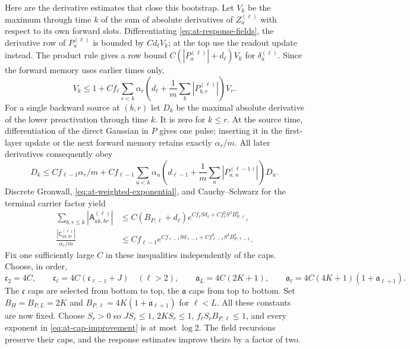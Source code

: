 Here are the derivative estimates that close this bootstrap.  Let $V_k$
be the maximum through time $k$ of the sum of absolute derivatives of
$Z_a^{(\ell)}$ with respect to its own forward slots.  Differentiating
\eqref{eq:at-response-fields}, the derivative row of $P_a^{(\ell)}$
is bounded by $C d_\ell V_k$; at the top use the readout update instead.
The product rule gives a row bound
$C(|P_a^{(\ell)}|+d_\ell)V_k$ for $\delta_a^{(\ell)}$.  Since the
forward memory uses earlier times only,
\[
 V_k\le1+Cf_\ell\sum_{r<k}\alpha_r
       \left(d_\ell+\frac1m\sum_b|P_{b,r}^{(\ell)}|\right)V_r.
\]
For a single backward source at $(b,r)$ let $D_k$ be the maximal
absolute derivative of the lower preactivation through time $k$.
It is zero for $k\le r$.  At the source time, differentiation of the
direct Gaussian in $P$ gives one pulse; inserting it in the first-layer
update or the next forward memory retains exactly $\alpha_r/m$.
All later derivatives consequently obey
\[
 D_k\le Cf_{\ell-1}\alpha_r/m+
 Cf_{\ell-1}\sum_{u<k}\alpha_u
       \left(d_{\ell-1}+\frac1m\sum_a|P_{a,u}^{(\ell-1)}|\right)D_u.
\]
Discrete Gronwall, \eqref{eq:at-weighted-exponential}, and
Cauchy--Schwarz for the terminal carrier factor yield
\begin{align}
 \sum_{b,r\le k}|\mathsf A_{ak,br}^{(\ell)}|
 &\le C(B_{P,\ell}+d_\ell)
       e^{Cf_\ell Sd_\ell+Cf_\ell^2S^2B_{P,\ell}^2},\nonumber\\
 \frac{|\mathsf C_{ak,br}^{(\ell)}|}{\alpha_r/m}
 &\le Cf_{\ell-1}
       e^{Cf_{\ell-1}Sd_{\ell-1}
                          +Cf_{\ell-1}^2S^2B_{P,\ell-1}^2}.
 \label{eq:at-cap-improvement}
\end{align}
Fix one sufficiently large $C$ in these inequalities independently of
the caps.  Choose, in order,
\[
 \mathfrak c_2=4C,\qquad
 \mathfrak c_\ell=4C(\mathfrak c_{\ell-1}+J)\quad(\ell>2),
 \qquad
 \mathfrak a_L=4C(2K+1),\qquad
 \mathfrak a_\ell=4C(4K+1)(1+\mathfrak a_{\ell+1}) .
\]
The $\mathfrak c$ caps are selected from bottom to top, the
$\mathfrak a$ caps from top to bottom.  Set
$B_H=B_{P,L}=2K$ and
$B_{P,\ell}=4K(1+\mathfrak a_{\ell+1})$ for $\ell<L$.
All these constants are now fixed.  Choose $S_r>0$ so $JS_r\le1$,
$2KS_r\le1$, $f_\ell S_rB_{P,\ell}\le1$, and every exponent in
\eqref{eq:at-cap-improvement} is at most $\log2$.
The field recursions preserve their caps, and the response estimates
improve theirs by a factor of two.

